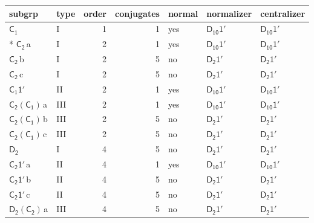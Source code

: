 \documentclass[10pt,a4paper]{article}
\numberwithin{equation}{section}
\newcommand{\grp}[1]{\mathsf{#1}}
\newcommand{\clsletter}[1]{\,{\scriptsize\color{black!55}#1}}
\begin{document}
{\small\begin{longtable}{@{}llrrlll@{}}\toprule
subgrp & type & order & conjugates & normal & normalizer & centralizer\\\midrule\endhead
\bottomrule\endfoot\endlastfoot
\href{../../../rotation/data/pdf/C1.pdf}{$\grp{C_{1}}$} & I & 1 & 1 & yes & \href{D10-1p.pdf}{$\grp{D_{10}1'}$} & \href{D10-1p.pdf}{$\grp{D_{10}1'}$}\\*
\href{../../../rotation/data/pdf/C2.pdf}{$\grp{C_{2}}$}\clsletter{a} & I & 2 & 1 & yes & \href{D10-1p.pdf}{$\grp{D_{10}1'}$} & \href{D10-1p.pdf}{$\grp{D_{10}1'}$}\\
\href{../../../rotation/data/pdf/C2.pdf}{$\grp{C_{2}}$}\clsletter{b} & I & 2 & 5 & no & \href{D2-1p.pdf}{$\grp{D_{2}1'}$} & \href{D2-1p.pdf}{$\grp{D_{2}1'}$}\\
\href{../../../rotation/data/pdf/C2.pdf}{$\grp{C_{2}}$}\clsletter{c} & I & 2 & 5 & no & \href{D2-1p.pdf}{$\grp{D_{2}1'}$} & \href{D2-1p.pdf}{$\grp{D_{2}1'}$}\\
\href{C1-1p.pdf}{$\grp{C_{1}1'}$} & II & 2 & 1 & yes & \href{D10-1p.pdf}{$\grp{D_{10}1'}$} & \href{D10-1p.pdf}{$\grp{D_{10}1'}$}\\
\href{C2-C1.pdf}{$\grp{C_{2}}(\grp{C_{1}})$}\clsletter{a} & III & 2 & 1 & yes & \href{D10-1p.pdf}{$\grp{D_{10}1'}$} & \href{D10-1p.pdf}{$\grp{D_{10}1'}$}\\
\href{C2-C1.pdf}{$\grp{C_{2}}(\grp{C_{1}})$}\clsletter{b} & III & 2 & 5 & no & \href{D2-1p.pdf}{$\grp{D_{2}1'}$} & \href{D2-1p.pdf}{$\grp{D_{2}1'}$}\\
\href{C2-C1.pdf}{$\grp{C_{2}}(\grp{C_{1}})$}\clsletter{c} & III & 2 & 5 & no & \href{D2-1p.pdf}{$\grp{D_{2}1'}$} & \href{D2-1p.pdf}{$\grp{D_{2}1'}$}\\
\href{../../../rotation/data/pdf/D2.pdf}{$\grp{D_{2}}$} & I & 4 & 5 & no & \href{D2-1p.pdf}{$\grp{D_{2}1'}$} & \href{D2-1p.pdf}{$\grp{D_{2}1'}$}\\
\href{C2-1p.pdf}{$\grp{C_{2}1'}$}\clsletter{a} & II & 4 & 1 & yes & \href{D10-1p.pdf}{$\grp{D_{10}1'}$} & \href{D10-1p.pdf}{$\grp{D_{10}1'}$}\\
\href{C2-1p.pdf}{$\grp{C_{2}1'}$}\clsletter{b} & II & 4 & 5 & no & \href{D2-1p.pdf}{$\grp{D_{2}1'}$} & \href{D2-1p.pdf}{$\grp{D_{2}1'}$}\\
\href{C2-1p.pdf}{$\grp{C_{2}1'}$}\clsletter{c} & II & 4 & 5 & no & \href{D2-1p.pdf}{$\grp{D_{2}1'}$} & \href{D2-1p.pdf}{$\grp{D_{2}1'}$}\\
\href{D2-C2.pdf}{$\grp{D_{2}}(\grp{C_{2}})$}\clsletter{a} & III & 4 & 5 & no & \href{D2-1p.pdf}{$\grp{D_{2}1'}$} & \href{D2-1p.pdf}{$\grp{D_{2}1'}$}\\

\end{longtable}}
\end{document}
